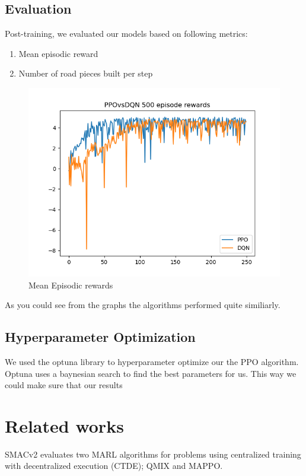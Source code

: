 \documentclass[conference]{IEEEtran}
\begin{document}
\subsection{Evaluation}
Post-training, we evaluated our models based on following metrics:
\begin{enumerate}
  \item Mean episodic reward
  \item Number of road pieces built per step
\end{enumerate}

\begin{figure}[h!]
  \includegraphics[width=\columnwidth]{graphs/PPOvsDQN250.png}
  \caption{Mean Episodic rewards}
\end{figure}

As you could see from the graphs the algorithms performed quite similiarly.

\subsection{Hyperparameter Optimization}
We used the optuna library to hyperparameter optimize our the PPO algorithm. Optuna uses a baynesian search to find the best parameters for us. This way we could make sure that our results




\section{Related works}
SMACv2\cite{ellis2022smacv2} evaluates two MARL algorithms for problems using centralized training with
decentralized execution (CTDE); QMIX and MAPPO.
\end{document}
